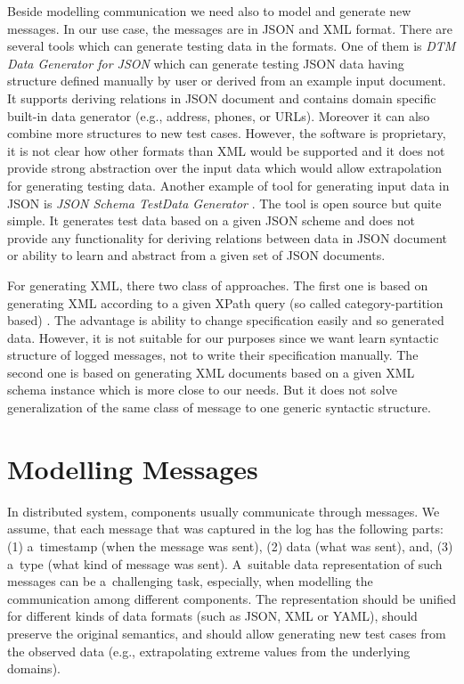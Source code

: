 {Beside modelling communication we need also to model and generate new messages.
In our use case, the messages are in JSON and XML format.
There are several tools which can generate testing data in the formats.
One of them is \emph{DTM Data Generator for JSON} \cite{ref_dtm} which can
generate testing JSON data having structure defined manually by user
or derived from an example input document.
It supports deriving relations in JSON document and contains domain
specific built-in data generator (e.g., address, phones, or URLs).
Moreover it can also combine more structures to new test cases.
However, the software is proprietary, it is not clear how other
formats than XML would be supported and it does not provide
strong abstraction over the input data which would allow
extrapolation for generating testing data.
Another example of tool for generating input data in JSON is \emph{JSON Schema TestData Generator} \cite{ref_stg}.
The tool is open source but quite simple.
It generates test data based on a given JSON scheme and does not provide
any functionality for deriving relations between data in JSON document
or ability to learn and abstract from a given set of JSON documents.

For generating XML, there two class of approaches.
The first one is based on generating XML according to a given XPath query
(so called category-partition based) \cite{xpath1, xpath2}.
The advantage is ability to change specification easily and so generated data.
However, it is not suitable for our purposes since we want learn syntactic structure
of logged messages, not to write their specification manually.
The second one is based on generating XML documents based on a given XML schema \cite{xmlscheme} instance
which is more close to our needs.
But it does not solve generalization of the same class of message to one generic syntactic structure. 

\section{Modelling Messages} \label{sec:messages} 

In distributed system, components usually communicate through messages.
%
We assume, that each message that was captured in the log has the following
parts: (1) a~timestamp (when the message was sent), (2) data (what was sent),
and, (3) a~type (what kind of message was sent).
%
A~suitable data representation of such messages can be a~challenging task,
especially, when modelling the communication among different components.  
%
The representation should be unified for different kinds of data formats (such
as JSON, XML or YAML), should preserve the original semantics, and should allow
generating new test cases from the observed data (e.g., extrapolating extreme
values from the underlying domains).  

}
